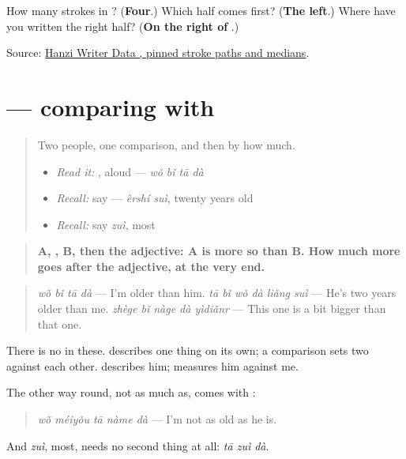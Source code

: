 \begin{tcolorbox}[breakable,colback=teal!4,colframe=teal!35!black,title={Before you move on}]
How many strokes in ? (\textbf{Four}.) Which half comes first? (\textbf{The left}.) Where have you written the right half? (\textbf{On the right of }.)

Source: \href{https://raw.githubusercontent.com/chanind/hanzi-writer-data/68d10a4b21150cae5e1ebbd223eed289cf32d90c/data/\%E6\%AF\%94.json}{Hanzi Writer Data , pinned stroke paths and medians}.
\end{tcolorbox}
\section[\texorpdfstring{\zh{他比我大两岁} (tā bǐ wǒ dà liǎng suì)}{他比我大两岁 (tā bǐ wǒ dà liǎng suì)}]{ — comparing with }

\label{lesson:ZH-C153-bi-grammar}



\begin{quote}
Two people, one comparison, and then by how much.

\begin{itemize}
\raggedright
  \item \emph{Read it:} , aloud — \emph{wǒ bǐ tā dà}
  \item \emph{Recall:} say  — \emph{èrshí suì}, twenty years old
  \item \emph{Recall:} say \emph{zuì}, most
\end{itemize}
\end{quote}

\begin{grammarlens}[title={Grammar Lens: \zh{比}, then the adjective, then by how much}]
\begin{quote}
\textbf{A, , B, then the adjective: A is more so than B. How much more goes after the adjective, at the very end.}
\end{quote}

\begin{quote}
\textbf{} \emph{wǒ bǐ tā dà} — I'm older than him. \textbf{} \emph{tā bǐ wǒ dà liǎng suì} — He's two years older than me. \textbf{} \emph{zhège bǐ nàge dà yìdiǎnr} — This one is a bit bigger than that one.
\end{quote}

There is no  in these.  describes one thing on its own; a comparison sets two against each other.  describes him;  measures him against me.

The other way round, not as much as, comes with :

\begin{quote}
\textbf{} \emph{wǒ méiyǒu tā nàme dà} — I'm not as old as he is.
\end{quote}

And \emph{zuì}, most, needs no second thing at all: \emph{tā zuì dà}.
\end{grammarlens}

